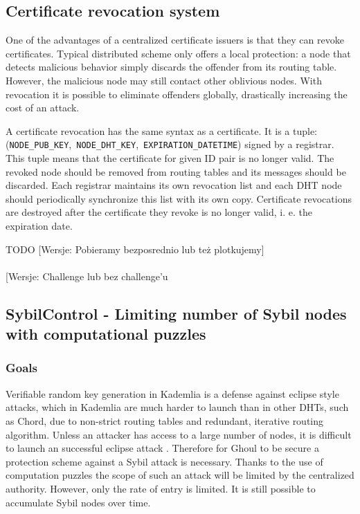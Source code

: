 \subsection{Certificate revocation system}

One of the advantages of a centralized certificate issuers is that they can
revoke certificates. Typical distributed scheme only offers a local protection:
a node that detects malicious behavior simply discards the offender from its
routing table. However, the malicious node may still contact other oblivious
nodes. With revocation it is possible to eliminate offenders globally,
drastically increasing the cost of an attack.

A certificate revocation has the same syntax as a certificate. It is a
tuple:\\
(\texttt{NODE\_PUB\_KEY},~\texttt{NODE\_DHT\_KEY},~\texttt{EXPIRATION\_DATETIME})
signed by a registrar. This tuple means that the certificate for given ID pair
is no longer valid. The revoked node should be removed from routing tables and
its messages should be discarded. Each registrar maintains its own revocation
list and each DHT node should periodically synchronize this list with its own
copy.
Certificate revocations are destroyed after the certificate they revoke is no
longer valid, i. e. the expiration date.

TODO
[Wersje: Pobieramy bezposrednio lub też plotkujemy]\\
[Wersje: Może jakiś merkle tree, bloom filter]\\
[Wersje: Challenge lub bez challenge'u

\subsection{SybilControl - Limiting number of Sybil nodes with computational
puzzles}
\subsubsection{Goals}
  Verifiable random key generation in Kademlia is a defense against eclipse
  style attacks, which in Kademlia are much harder to launch than in other
  DHTs, such as Chord, due to non-strict routing tables and redundant, iterative
  routing algorithm. Unless an attacker has access to a large number of nodes,
  it is difficult to launch an successful eclipse attack \cite{mac09}. Therefore
  for Ghoul to be secure a protection scheme against a Sybil attack is
  necessary.
  Thanks to the use of computation puzzles the scope of such an attack will be
  limited by the centralized authority.
  However, only the rate of entry is limited.
  It is still possible to accumulate Sybil nodes over time.

